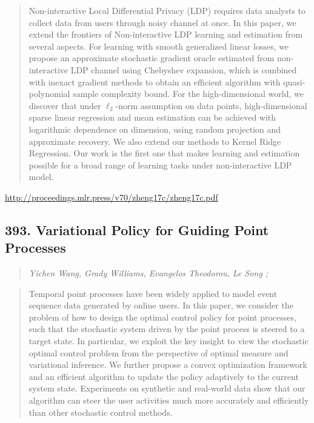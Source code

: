 \documentclass{article}
\begin{document}
\begin{quote}
    Non-interactive Local Differential Privacy (LDP) requires data analysts to collect data from users through noisy channel at once. In this paper, we extend the frontiers of Non-interactive LDP learning and estimation from several aspects. For learning with smooth generalized linear losses, we propose an approximate stochastic gradient oracle estimated from non-interactive LDP channel using Chebyshev expansion, which is combined with inexact gradient methods to obtain an efficient algorithm with quasi-polynomial sample complexity bound. For the high-dimensional world, we discover that under $\ell_2$-norm assumption on data points, high-dimensional sparse linear regression and mean estimation can be achieved with logarithmic dependence on dimension, using random projection and approximate recovery. We also extend our methods to Kernel Ridge Regression. Our work is the first one that makes learning and estimation possible for a broad range of learning tasks under non-interactive LDP model.  
\end{quote}

\href{http://proceedings.mlr.press/v70/zheng17c/zheng17c.pdf}{http://proceedings.mlr.press/v70/zheng17c/zheng17c.pdf}

\subsection{393. Variational Policy for Guiding Point Processes}

\begin{quote}
\footnotesize{\textit{Yichen Wang, Grady Williams, Evangelos Theodorou, Le Song ;}}

\end{quote}

\begin{quote}
    Temporal point processes have been widely applied to model event sequence data generated by online users. In this paper, we consider the problem of how to design the optimal control policy for point processes, such that the stochastic system driven by the point process is steered to a target state. In particular, we exploit the key insight to view the stochastic optimal control problem from the perspective of optimal measure and variational inference. We further propose a convex optimization framework and an efficient algorithm to update the policy adaptively to the current system state. Experiments on synthetic and real-world data show that our algorithm can steer the user activities much more accurately and efficiently than other stochastic control methods.  
\end{quote}
\end{document}
